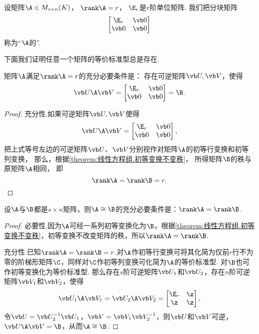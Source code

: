 \begin{definition}
设矩阵\(\A \in M_{s \times n}(K)\)，
\(\rank\A = r\)，
\(\E_r\)是\(r\)阶单位矩阵.
我们把分块矩阵\[
	\begin{bmatrix}
		\E_r & \vb0 \\
		\vb0 & \vb0
	\end{bmatrix}
\]
称为“\(\A\)的”.
\end{definition}

下面我们证明任意一个矩阵的等价标准型总是存在.
\begin{theorem}\label{theorem:矩阵乘积的秩.等价标准型的存在性}
矩阵\(\A\)满足\(\rank\A=r\)的充分必要条件是：
存在可逆矩阵\(\P,\Q\)，使得\[
	\P \A \Q
	= \begin{bmatrix}
		\E_r & \vb0 \\
		\vb0 & \vb0
	\end{bmatrix} = \B.
\]
\begin{proof}
充分性.如果可逆矩阵\(\P,\Q\)使得\[
	\P\A\Q
	= \begin{bmatrix}
		\E_r & \vb0 \\
		\vb0 & \vb0
	\end{bmatrix},
\]
把上式等号左边的可逆矩阵\(\P\)、\(\Q\)分别视作对矩阵\(\A\)的初等行变换和初等列变换，
那么，根据\cref{theorem:线性方程组.初等变换不变秩}，
所得矩阵\(\B\)的秩与原矩阵\(\A\)相同，
即\[
	\rank\A = \rank\B = r.
	\qedhere
\]
\end{proof}
\end{theorem}

\begin{theorem}
设\(\A\)与\(\B\)都是\(s \times n\)矩阵，则\(\A \cong \B\)的充分必要条件是：\(\rank\A = \rank\B\).
\begin{proof}
必要性.因为\(\A\)可经一系列初等变换化为\(\B\)，根据\cref{theorem:线性方程组.初等变换不变秩}，初等变换不改变矩阵的秩，所以\(\rank\A = \rank\B\).

充分性.已知\(\rank\A = \rank\B = r\).对\(\A\)作初等行变换可将其化简为仅前\(r\)行不为零的阶梯形矩阵\(\C\)，同样对\(\C\)作初等列变换可化简为\(\A\)的等价标准型.
对\(\B\)也可作初等变换化为等价标准型.
那么存在\(s\)阶可逆矩阵\(\P_1\)和\(\P_2\)，存在\(n\)阶可逆矩阵\(\Q_1\)和\(\Q_2\)，使得\[
\P_1 \A \Q_1 = \P_2 \A \Q_2 = \begin{bmatrix} \E_r & \z \\ \z & \z \end{bmatrix},
\]令\(\P = \P_2^{-1} \P_1\)，\(\Q = \Q_1 \Q_2^{-1}\)，则\(\P\)和\(\Q\)可逆，\(\P \A \Q = \B\)，从而\(\A \cong \B\).
\end{proof}
\end{theorem}

